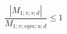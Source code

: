 \documentclass[12pt]{article}
\begin{document}
\begin{displaymath}
\frac {|M_{1;v;s;d}|} {M_{1;v;sym;u;d}} \leq 1
\end{displaymath}
\end{document}
